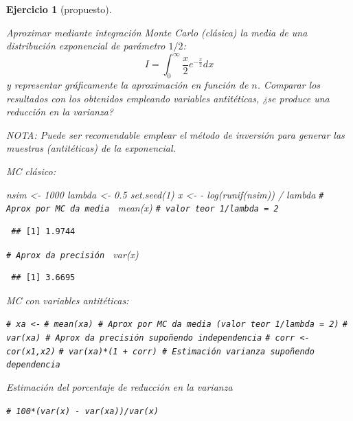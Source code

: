 \documentclass[
  10pt,
]{book}
\newenvironment{Shaded}{\begin{snugshade}}{\end{snugshade}}
\newcommand{\CommentTok}[1]{\textcolor[rgb]{0.56,0.35,0.01}{\textit{#1}}}
\newcommand{\DecValTok}[1]{\textcolor[rgb]{0.00,0.00,0.81}{#1}}
\newcommand{\FloatTok}[1]{\textcolor[rgb]{0.00,0.00,0.81}{#1}}
\newcommand{\FunctionTok}[1]{\textcolor[rgb]{0.00,0.00,0.00}{#1}}
\newcommand{\NormalTok}[1]{#1}
\newcommand{\OtherTok}[1]{\textcolor[rgb]{0.56,0.35,0.01}{#1}}
\newcommand{\SpecialCharTok}[1]{\textcolor[rgb]{0.00,0.00,0.00}{#1}}
\theoremstyle{break}
\newtheorem{exercise}{Ejercicio}[chapter]
\theoremstyle{nonumberplain}
\renewcommand{\CommentTok}[1]{\textcolor[rgb]{0.41,0.41,0.41}{\texttt{#1}}}
\begin{document}
\begin{exercise}[propuesto]
\protect\hypertarget{exr:int-ainv}{}\label{exr:int-ainv}

Aproximar mediante integración Monte Carlo (clásica) la media de una distribución exponencial de parámetro \(1/2\):
\[I=\int_{0}^{\infty}\frac{x}{2}e^{-\frac{x}{2}}dx\]
y representar gráficamente la aproximación en función de \(n\).
Comparar los resultados con los obtenidos empleando variables antitéticas,
¿se produce una reducción en la varianza?

NOTA: Puede ser recomendable emplear el método de inversión para generar las muestras (antitéticas) de la exponencial.

MC clásico:

\begin{Shaded}
\begin{Highlighting}[]
\NormalTok{nsim }\OtherTok{\textless{}{-}} \DecValTok{1000}
\NormalTok{lambda }\OtherTok{\textless{}{-}} \FloatTok{0.5}
\FunctionTok{set.seed}\NormalTok{(}\DecValTok{1}\NormalTok{)}
\NormalTok{x }\OtherTok{\textless{}{-}} \SpecialCharTok{{-}} \FunctionTok{log}\NormalTok{(}\FunctionTok{runif}\NormalTok{(nsim)) }\SpecialCharTok{/}\NormalTok{ lambda}
\CommentTok{\# Aprox por MC da media }
\FunctionTok{mean}\NormalTok{(x) }\CommentTok{\# valor teor 1/lambda = 2}
\end{Highlighting}
\end{Shaded}

\begin{verbatim}
 ## [1] 1.9744
\end{verbatim}

\begin{Shaded}
\begin{Highlighting}[]
\CommentTok{\# Aprox da precisión }
\FunctionTok{var}\NormalTok{(x)  }
\end{Highlighting}
\end{Shaded}

\begin{verbatim}
 ## [1] 3.6695
\end{verbatim}

MC con variables antitéticas:

\begin{Shaded}
\begin{Highlighting}[]
\CommentTok{\# xa \textless{}{-}}
\CommentTok{\# mean(xa) \# Aprox por MC da media (valor teor 1/lambda = 2)}
\CommentTok{\# var(xa)  \# Aprox da precisión supoñendo independencia}
\CommentTok{\# corr \textless{}{-} cor(x1,x2)}
\CommentTok{\# var(xa)*(1 + corr) \# Estimación varianza supoñendo dependencia}
\end{Highlighting}
\end{Shaded}

Estimación del porcentaje de reducción en la varianza

\begin{Shaded}
\begin{Highlighting}[]
\CommentTok{\# 100*(var(x) {-} var(xa))/var(x)}
\end{Highlighting}
\end{Shaded}

\end{exercise}
\end{document}
